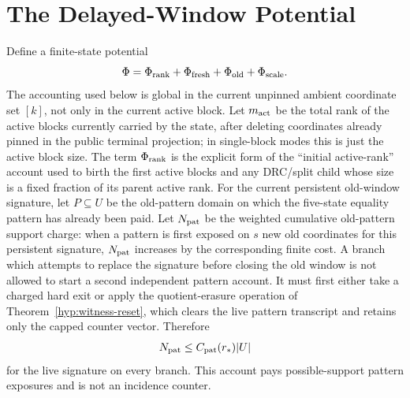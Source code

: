 \documentclass[11pt]{article}
\begin{document}
\section{The Delayed-Window Potential}
\label{sec:potential}

Define a finite-state potential
\[
  \Phi=\Phi_{\rm rank}+\Phi_{\rm fresh}+\Phi_{\rm old}+\Phi_{\rm scale}.
\]
The accounting used below is global in the current unpinned ambient coordinate
set $[k]$, not only in the current active block.  Let $m_{\rm act}$ be the total
rank of the active blocks currently carried by the state, after deleting
coordinates already pinned in the public terminal projection; in single-block
modes this is just the active block size.  The term $\Phi_{\rm rank}$ is the explicit form of the
``initial active-rank'' account used to birth the first active blocks and any
DRC/split child whose size is a fixed fraction of its parent active rank.
For the current persistent old-window signature, let $P\subseteq U$ be the
old-pattern domain on which the five-state equality pattern has already been
paid.  Let $N_{\rm pat}$ be the weighted cumulative old-pattern support charge:
when a pattern is first exposed on $s$ new old coordinates for this persistent
signature, $N_{\rm pat}$ increases by the corresponding finite cost.  A branch
which attempts to replace the signature before closing the old window is not
allowed to start a second independent pattern account.  It must first either
take a charged hard exit or apply the quotient-erasure operation of
Theorem~\ref{hyp:witness-reset}, which clears the live pattern transcript and
retains only the capped counter vector.  Therefore
\[
  N_{\rm pat}\le C_{\rm pat}(r_*)|U|
\]
for the live signature on every branch.  This account pays possible-support
pattern exposures and is not an incidence counter.
\end{document}
